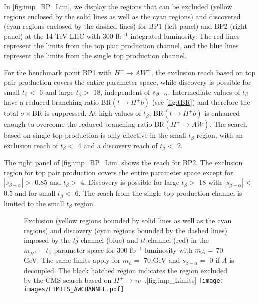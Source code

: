 In \autoref{fig:imp_BP_Lim}, we display the regions that can be excluded (yellow regions enclosed by the solid lines as well as the cyan regions) and discovered (cyan regions enclosed by the dashed lines) for BP1 (left panel) and BP2 (right panel) at the 14 TeV LHC with 300 fb$^{-1}$ integrated luminosity. The red lines represent the limits from the top pair production channel, and the blue lines represent the limits from the single top production channel.

For the benchmark point BP1 with $H^{\pm} \rightarrow AW^{\pm}$, the exclusion reach based on top pair production covers the entire parameter space, while discovery is possible for small $t_{\beta}<$ 6 and large $t_{\beta}>$ 18, independent of $s_{\beta-\alpha}$. Intermediate values of $t_{\beta}$ have a reduced branching ratio BR$(t \rightarrow H^{\pm} b)$ (see \autoref{fig:tBR}) and therefore the total $\sigma\times$BR is suppressed. At high values of $t_{\beta}$, BR$(t \rightarrow H^{\pm}b)$ is enhanced enough to overcome the reduced branching ratio BR$(H^{\pm} \rightarrow AW)$. The search based on single top production is only effective in the small $t_{\beta}$ region, with an exclusion reach of $t_{\beta} <$ 4 and a discovery reach of $t_{\beta}<$ 2. 

The right panel of \autoref{fig:imp_BP_Lim} shows the reach for BP2. The exclusion region for top pair production covers the entire parameter space except for $|s_{\beta-\alpha}| >$ 0.85 and $t_{\beta}>$ 4. Discovery is possible for large $t_{\beta}>$ 18 with $|s_{\beta-\alpha}|<$ 0.5 and for small $t_{\beta}<$ 6. The reach from the single top production channel is limited to the small $t_{\beta}$ region.
\begin{figure}
  \begin{sidecaption}{Exclusion (yellow regions bounded by solid lines as well as the cyan regions) and discovery (cyan regions bounded by the dashed lines) imposed by the $tj$-channel (blue) and $tt$-channel (red) in the $m_{H^{\pm}}-t_{\beta}$ parameter space for 300 fb$^{-1}$ luminosity with $m_A=$ 70 GeV. The same limits apply for $m_{h}=$ 70 GeV and $s_{\beta-\alpha}=$ 0 if \emph{A} is decoupled. The black hatched region indicates the region excluded by the CMS search based on $H^{\pm} \rightarrow \tau \nu$~\cite{CMS:2014cdp}.}[fig:imp_Limits]
 \centering
 	\texttt{[image: images/LIMITS\_AWCHANNEL.pdf]}
  \end{sidecaption}
 \vspace{\onelineskip}
\hrule
\end{figure}

